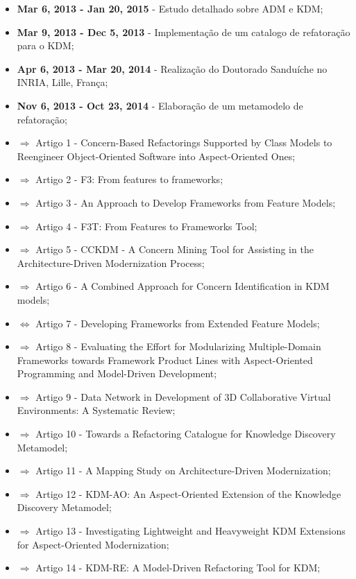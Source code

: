 \begin{itemize}
\item \textbf{Mar 6, 2013 - Jan 20, 2015} - Estudo detalhado sobre ADM e KDM;
\item \textbf{Mar 9, 2013 - Dec 5, 2013} - Implementação de um catalogo de refatoração para o KDM;
\item \textbf{Apr 6, 2013 - Mar 20, 2014} - Realização do Doutorado Sanduíche no INRIA, Lille, França;
\item \textbf{Nov 6, 2013 - Oct 23, 2014} - Elaboração de um metamodelo de refatoração;
\item $\Rightarrow$ Artigo 1 - Concern-Based Refactorings Supported by Class Models to Reengineer Object-Oriented Software into Aspect-Oriented Ones;
\item $\Rightarrow$ Artigo 2 - F3: From features to frameworks;
\item $\Rightarrow$ Artigo 3 - An Approach to Develop Frameworks from Feature Models;
\item $\Rightarrow$ Artigo 4 - F3T: From Features to Frameworks Tool;
\item $\Rightarrow$ Artigo 5 - CCKDM - A Concern Mining Tool for Assisting in the Architecture-Driven Modernization Process;
\item $\Rightarrow$ Artigo 6 - A Combined Approach for Concern Identification in KDM models;
\item $\Leftrightarrow$ Artigo 7 - Developing Frameworks from Extended Feature Models;
\item $\Rightarrow$ Artigo 8 - Evaluating the Effort for Modularizing Multiple-Domain Frameworks towards Framework Product Lines with Aspect-Oriented Programming and Model-Driven Development;
\item $\Rightarrow$ Artigo 9 - Data Network in Development of 3D Collaborative Virtual Environments: A Systematic Review;
\item $\Rightarrow$ Artigo 10 - Towards a Refactoring Catalogue for Knowledge Discovery Metamodel;
\item $\Rightarrow$ Artigo 11 - A Mapping Study on Architecture-Driven Modernization;
\item $\Rightarrow$ Artigo 12 - KDM-AO: An Aspect-Oriented Extension of the Knowledge Discovery Metamodel;
\item $\Rightarrow$ Artigo 13 - Investigating Lightweight and Heavyweight KDM Extensions for Aspect-Oriented Modernization;
\item $\Rightarrow$ Artigo 14 - KDM-RE: A Model-Driven Refactoring Tool for KDM;


\end{itemize}
